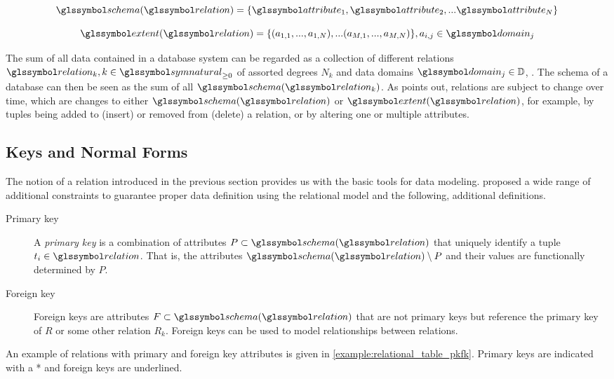 \begin{equation}
    \schema (\relation) = \lbrace \attribute_1, \attribute_2, ... \attribute_N \rbrace
\end{equation}

\begin{equation}
    \extent (\relation) = \lbrace (a_{1,1}, ..., a_{1,N}), ... (a_{M,1}, ..., a_{M,N})\rbrace, a_{i,j} \in \domain_j 
\end{equation}

The sum of all data contained in a database system can be regarded as a collection of different relations $\relation_k, k \in \symnatural_{\geq 0}$ of assorted degrees $N_k$ and data domains $\domain_j \in \mathbb{D}$, . The schema of a database can then be seen as the sum of all $\schema(\relation_k)$. As \cite{Codd:1970Relational} points out, relations are subject to change over time, which are changes to either $\schema(\relation)$ or $\extent(\relation)$, for example, by tuples being added to (insert) or removed from (delete) a relation, or by altering one or multiple attributes.


\subsection{Keys and Normal Forms}

The notion of a relation introduced in the previous section provides us with the basic tools for data modeling. \cite{Codd:1970Relational} proposed a wide range of additional constraints to guarantee proper data definition using the relational model and the following, additional definitions. 

\begin{description}
    \item[Primary key] A \emph{primary key} is a combination of attributes $P \subset \schema(\relation)$ that uniquely identify a tuple $t_i \in \relation$. That is, the attributes $\schema(\relation) \setminus P$ and their values are functionally determined by $P$.
    \item[Foreign key] Foreign keys are attributes $F \subset \schema(\relation)$ that are not primary keys but reference the primary key of $R$ or some other relation $R_k$. Foreign keys can be used to model relationships between relations.
\end{description}

An example of relations with primary and foreign key attributes is given in \cref{example:relational_table_pkfk}. Primary keys are indicated with a * and foreign keys are underlined.

